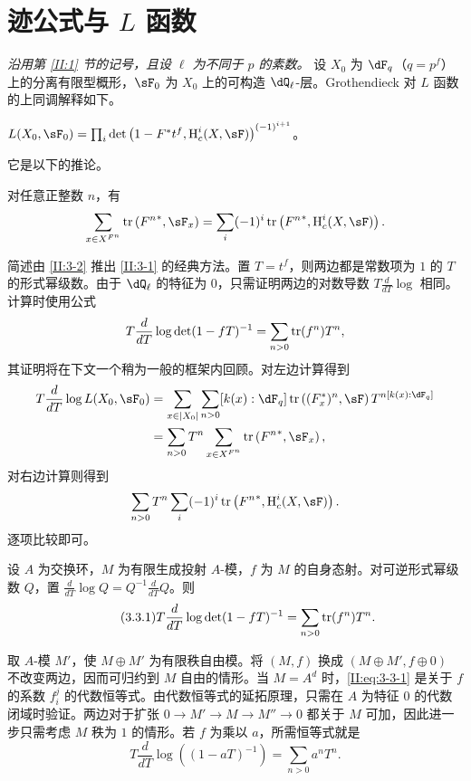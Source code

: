 \section{迹公式与 \texorpdfstring{$L$}{L} 函数}\label{II:3}
\emph{沿用第 \ref{II:1} 节的记号，且设 $\ell$ 为不同于 $p$ 的素数。}
设 $X_0$ 为 $\dF_q$（$q=p^f$）上的分离有限型概形，$\sF_0$ 为 $X_0$ 上的可构造 $\dQ_\ell$-层。Grothendieck 对 $L$ 函数的上同调解释如下。
\begin{theorem_}\label{II:3-1}
$L(X_0,\sF_0)=\prod_i\det\left(1-F^*t^f,\h_c^i(X,\sF)\right)^{(-1)^{i+1}}$。
\end{theorem_}
它是以下的推论。
\begin{theorem_}\label{II:3-2}
对任意正整数 $n$，有
\[\sum_{x\in X^{F^n}}\tr\left({F^n}^*,\sF_x\right)=\sum_i(-1)^i\tr\left({F^n}^*,\h_c^i(X,\sF)\right).\]
\end{theorem_}
简述由 \ref{II:3-2} 推出 \ref{II:3-1} 的经典方法。置 $T=t^f$，则两边都是常数项为 $1$ 的 $T$ 的形式幂级数。由于 $\dQ_\ell$ 的特征为 $0$，只需证明两边的对数导数 $T\frac{d}{dT}\log$ 相同。计算时使用公式
\[T\frac{d}{dT}\log\det(1-fT)^{-1}=\sum_{n>0}\operatorname{tr}(f^n)T^n,\]
其证明将在下文一个稍为一般的框架内回顾。对左边计算得到
\begin{align*}
T\frac{d}{dT}\log L(X_0,\sF_0)
&=\sum_{x\in|X_0|}\sum_{n>0}[k(x):\dF_q]\tr\left((F_x^*)^n,\sF\right)T^{n[k(x):\dF_q]}\\
&=\sum_{n>0}T^n\sum_{x\in X^{F^n}}\tr\left({F^n}^*,\sF_x\right),
\end{align*}
对右边计算则得到
\[\sum_{n>0}T^n\sum_i(-1)^i\tr\left({F^n}^*,\h_c^i(X,\sF)\right).\]
逐项比较即可。

\begin{proposition_}\label{II:3-3}
设 $A$ 为交换环，$M$ 为有限生成投射 $A$-模，$f$ 为 $M$ 的自身态射。对可逆形式幂级数 $Q$，置 $\frac{d}{dT}\log Q=Q^{-1}\frac{d}{dT}Q$。则
\begin{equation*}\tag{3.3.1}\label{II:eq:3-3-1}
T\frac{d}{dT}\log\det(1-fT)^{-1}=\sum_{n>0}\operatorname{tr}(f^n)T^n.
\end{equation*}
\end{proposition_}
取 $A$-模 $M'$，使 $M\oplus M'$ 为有限秩自由模。将 $(M,f)$ 换成 $(M\oplus M',f\oplus0)$ 不改变两边，因而可归约到 $M$ 自由的情形。当 $M=A^d$ 时，\eqref{II:eq:3-3-1} 是关于 $f$ 的系数 $f_i^j$ 的代数恒等式。由代数恒等式的延拓原理，只需在 $A$ 为特征 $0$ 的代数闭域时验证。两边对于扩张 $0\to M'\to M\to M''\to0$ 都关于 $M$ 可加，因此进一步只需考虑 $M$ 秩为 $1$ 的情形。若 $f$ 为乘以 $a$，所需恒等式就是
\[T\frac{d}{dT}\log((1-aT)^{-1})=\sum_{n>0}a^nT^n.\]

